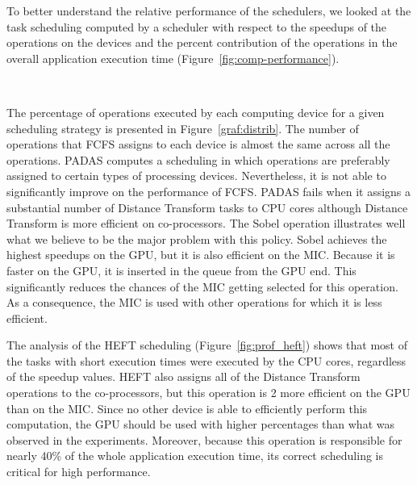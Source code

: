 To better understand the relative performance of the schedulers, we looked at the 
task scheduling computed by a scheduler with respect to the speedups of the operations 
on the devices and the percent 
contribution of the operations in the overall application execution time 
(Figure~\ref{fig:comp-performance}). 
\begin{figure*}[htb!]
\centering
\mbox{
}
\mbox{
}
\mbox{
}
\mbox{
}
\vspace{-1ex}
\caption{Task assignment profile for each of the operations executed in the image 
analysis application under different scheduling strategies. A fixed window size of 
 is used in all runs.} 
\vspace{-1ex}
\label{graf:distrib}
\end{figure*}
The percentage of operations executed by each computing device for a given 
scheduling strategy is presented in Figure~\ref{graf:distrib}. The number of
operations that FCFS assigns to each device is almost the same across 
all the operations. PADAS computes a
scheduling in which operations are preferably assigned to certain types of
processing devices. Nevertheless, it is not able to significantly improve on 
the performance of FCFS. 
PADAS fails when 
it assigns a substantial number of
Distance Transform tasks to CPU cores although Distance Transform is more efficient 
on co-processors.
The Sobel operation illustrates well what we believe to be the major problem with
this policy. Sobel achieves the highest speedups on the GPU, but it is also efficient on
the MIC. Because it is faster on the GPU, it is inserted in the queue from the 
GPU end. This significantly reduces the chances of the MIC getting 
selected for this operation. As a consequence, the MIC is used with other
operations for which it is less efficient.

The analysis of the HEFT scheduling (Figure~\ref{fig:prof_heft}) shows that
most of the tasks with short execution times were executed by the CPU cores, 
regardless of the speedup values. HEFT also assigns all of the
Distance Transform operations to the co-processors, but this operation is
2 more efficient on the GPU than on the MIC. Since no other device is able to
efficiently perform this computation, the GPU should be used with higher
percentages than what was observed in the experiments. Moreover, 
because this operation is
responsible for nearly 40\% of the whole application execution time, its
correct scheduling is critical for high performance. 

